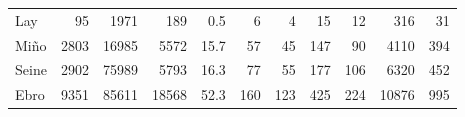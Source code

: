 \begin{table}[htbp]
\begin{tabular}{@{}lrrrrrrrrrr@{}}
Lay                                                  & 95                                                                         & 1971                                                                     & 189                                                                                & 0.5                                                                    & 6                                    & 4                                    & 15                                       & 12                                       & 316                                      & 31                                      \\
Mi\~no                                                 & 2803                                                                       & 16985                                                                    & 5572                                                                               & 15.7                                                                   & 57                                   & 45                                   & 147                                      & 90                                       & 4110                                     & 394                                     \\
Seine                                                & 2902                                                                       & 75989                                                                    & 5793                                                                               & 16.3                                                                   & 77                                   & 55                                   & 177                                      & 106                                      & 6320                                     & 452                                     \\
Ebro                                                 & 9351                                                                       & 85611                                                                    & 18568                                                                              & 52.3                                                                   & 160                                  & 123                                  & 425                                      & 224                                      & 10876                                    & 995                                     \\

\end{tabular}
\end{table}
